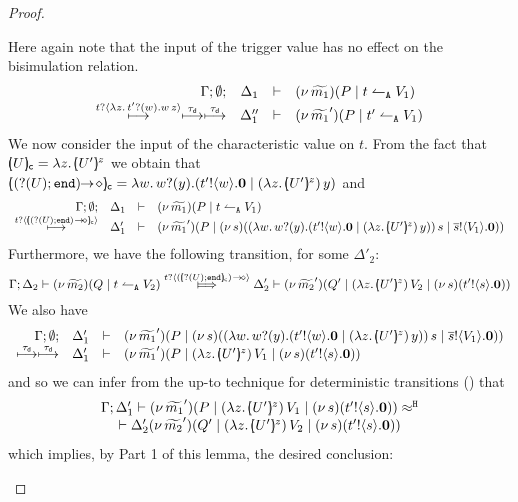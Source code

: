 \begin{proof}
\begin{enumerate}[$-$]
\begin{enumerate}[(a)]
\begin{enumerate}[i)]
							Here again note that the input of the trigger value has no effect on the
							bisimulation relation.
							\[
								\begin{array}{rcll} \Gamma; \emptyset; &\Delta_1& \vdash& (\nu\, \widetilde{m_1})(P \;|\; t \leftharpoonup_\mathtt{A} V_1  ) \\ \stackrel{t ? \langle \lambda z.\,t' ? (w) . w\, {z}  \rangle }{\longmapsto} \stackrel{\tau_{\mathsf{d}}}{\longmapsto} \stackrel{\tau_{\mathsf{d}}}{\longmapsto} &\Delta_1''& \vdash &  (\nu\, \widetilde{m_1}')(P \;|\; t' \leftharpoonup_\mathtt{A} V_1) \end{array}
							\]
%
							We now consider the input of the characteristic value on $t$.
							From the fact that $\omapchar{U} = \abs{z}{\mapchar{U'}{z}}$ we obtain that
							$\omapchar{\shot{(\btinp{U} \tinact)}} = \abs{w}{ \binp{w}{y} ( \bout{t'}{w} \inact \Par \appl{(\abs{z}{\mapchar{U'}{z}})}{y} ) }$
							and
							\[
								\mhorel{\Gamma}{\Delta_1}{\newsp{\widetilde{m_1}}{P \Par \ntrigger{t}{V_1}  } }
								{\hby{\bactinp{t}{\omapchar{\shot{(\btinp{U} \tinact)~}}}}}
								{\Delta_1'}{}{\newsp{\widetilde{m_1}'}{P \Par \newsp{s}{\appl{(\abs{w}{ \binp{w}{y} ( \bout{t'}{w} \inact \Par \appl{(\abs{z}{\mapchar{U'}{z}})}{y} ) })}{s} \Par \bout{\dual{s}}{V_1} \inact}}}
							\]
							Furthermore, we have the following transition, for some $\Delta'_2$:
							\[
								\horel{\Gamma}{\Delta_2}{\newsp{\widetilde{m_2}}{Q \Par \ntrigger{t}{V_2}  } }
								{\Hby{\bactinp{t}{\shot{(\omapchar{\btinp{U} \tinact})~}}}}
								{\Delta_2'}{\newsp{\widetilde{m_2}'}{Q' \Par \appl{(\abs{z}{\mapchar{U'}{z}})}{V_2} \Par \newsp{s}{\bout{t'}{s} \inact}}}
							\]
							We also have
							\[
								\mhorel{\Gamma}{\Delta_1'}{\newsp{\widetilde{m_1}'}{P \Par \newsp{s}{\appl{(\abs{w}{ \binp{w}{y} ( \bout{t'}{w} \inact \Par \appl{(\abs{z}{\mapchar{U'}{z}})}{y} ) })}{s} \Par \bout{\dual{s}}{V_1} \inact}}}
								{\hby{\dtau} \hby{\dtau}}
								{\Delta_1'}{}{\newsp{\widetilde{m_1}'}{P \Par \appl{(\abs{z}{\mapchar{U'}{z}})}{V_1} \Par \newsp{s}{\bout{t'}{s} \inact}}}
							\]
							and so we can infer from 
							the up-to 
							 technique for deterministic transitions  () that
							\[
							\begin{array}{c}
								\horel{\Gamma}{\Delta_1'}{\newsp{\widetilde{m_1}'}{P \Par \appl{(\abs{z}{\mapchar{U'}{z}})}{V_1} \Par \newsp{s}{\bout{t'}{s} \inact}}}
								{\hwb} \\
								{\Delta_2'}{\newsp{\widetilde{m_2}'}{Q' \Par \appl{(\abs{z}{\mapchar{U'}{z}})}{V_2} \Par \newsp{s}{\bout{t'}{s} \inact}}}
								\end{array}
							\]
							which implies, by Part 1 of this lemma, the desired conclusion:

\end{enumerate}
\end{enumerate}
\end{enumerate}
\end{proof}
